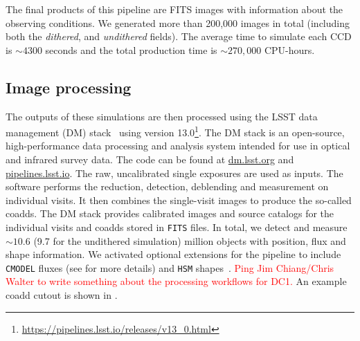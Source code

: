 \documentclass[twocolumn]{aastex62}
\begin{document}
The final products of this pipeline are FITS images with information about the observing conditions. We generated more than 200,000 images in total (including both the \textit{dithered}, and \textit{undithered} fields). The average time to simulate each CCD is $\sim 4300$ seconds and the total production time is $\sim 270,000$ CPU-hours.



\subsection{Image processing}
\label{sec:image_processing_pipeline}

The outputs of these simulations are then processed using the LSST data management (DM) stack~\citep{Overview,ScienceBook,WhitePaper,2017arXiv170506766B,2015arXiv151207914J} using version 13.0\footnote{\url{https://pipelines.lsst.io/releases/v13_0.html}}. The DM stack is an open-source, high-performance data processing and analysis system intended for use in optical and infrared survey data. The code can be found at \url{dm.lsst.org} and \url{pipelines.lsst.io}. The raw, uncalibrated single exposures are used as inputs. The software performs the reduction, detection, deblending and measurement on individual visits. It then combines the single-visit images to produce the so-called coadds. The DM stack provides calibrated images and source catalogs for the individual visits and coadds stored in \texttt{FITS} files. In total, we detect and measure $\sim 10.6$ (9.7 for the undithered simulation) million objects with position, flux and shape information. We activated optional extensions for the pipeline to include \texttt{CMODEL} fluxes (see \cite{2017arXiv170506766B} for more details) and \texttt{HSM} shapes~\citep{2003MNRAS.343..459H,2005MNRAS.361.1287M}.
\textcolor{red}{Ping Jim Chiang/Chris Walter to write something about the processing workflows for DC1.}
An example coadd cutout is shown in .
\end{document}
